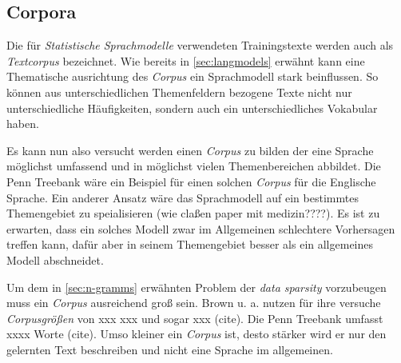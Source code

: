 \subsection{Corpora}
    Die für \emph{Statistische Sprachmodelle} verwendeten Trainingstexte werden auch als \emph{Textcorpus} bezeichnet. Wie bereits in \autoref{sec:langmodels} erwähnt kann eine Thematische ausrichtung des \emph{Corpus} ein Sprachmodell stark beinflussen. So können aus unterschiedlichen Themenfeldern bezogene Texte nicht nur unterschiedliche Häufigkeiten, sondern auch ein unterschiedliches Vokabular haben.
        
	Es kann nun also versucht werden einen \emph{Corpus} zu bilden der eine Sprache möglichst umfassend und in möglichst vielen Themenbereichen abbildet. Die Penn Treebank wäre ein Beispiel für einen solchen \emph{Corpus} für die Englische Sprache. Ein anderer Ansatz wäre das Sprachmodell auf ein bestimmtes Themengebiet zu speialisieren (wie claßen paper mit medizin????). Es ist zu erwarten, dass ein solches Modell zwar im Allgemeinen schlechtere Vorhersagen treffen kann, dafür aber in seinem Themengebiet besser als ein allgemeines Modell abschneidet.
        
        Um dem in \autoref{sec:n-gramms} erwähnten Problem der \emph{data sparsity} vorzubeugen muss ein \emph{Corpus} ausreichend groß sein. Brown u. a. nutzen für ihre versuche \emph{Corpusgrößen} von xxx xxx und sogar xxx (cite). Die Penn Treebank umfasst xxxx Worte (cite). Umso kleiner ein \emph{Corpus} ist, desto stärker wird er nur den gelernten Text beschreiben und nicht eine Sprache im allgemeinen.